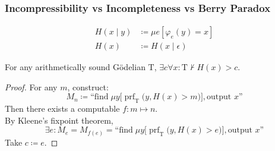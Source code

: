 \documentclass[UTF8,11pt,colorlinks,compress,openany]{beamer}%
\begin{document}
\begin{frame}\frametitle{Incompressibility vs Incompleteness vs Berry Paradox}
\setlength\abovedisplayskip{0pt}
\setlength\belowdisplayskip{0pt}
	\begin{definition}
		\begin{align*}
		H(x\mid y)&\coloneqq \mu e[\varphi_e(y)=x]\\
		H(x)&\coloneqq H(x\mid \epsilon)
		\end{align*}
	\end{definition}
	\begin{theorem}[Chaitin]
		For any arithmetically sound G\"odelian $\mathrm{T}$, $\exists c\forall x: \mathrm{T}\nvdash H(x)>c$.
	\end{theorem}
	\begin{proof}
		For any $m$, construct:
		\[M_n\coloneqq \text{``find}\;\mu y\big[\operatorname{prf}_\mathrm{T}\big(y,H(x)>m\big)\big], \text{output $x$''}\]
		Then there exists a computable $f: m\mapsto n$.\\
		By Kleene's fixpoint theorem,
		\[\exists e: M_e=M_{f(e)}=\text{``find}\;\mu y\big[\operatorname{prf}_\mathrm{T}\big(y,H(x)>e\big)\big], \text{output $x$''}\]
		Take $c\coloneqq e$.
	\end{proof}
\end{frame}
\end{document}
